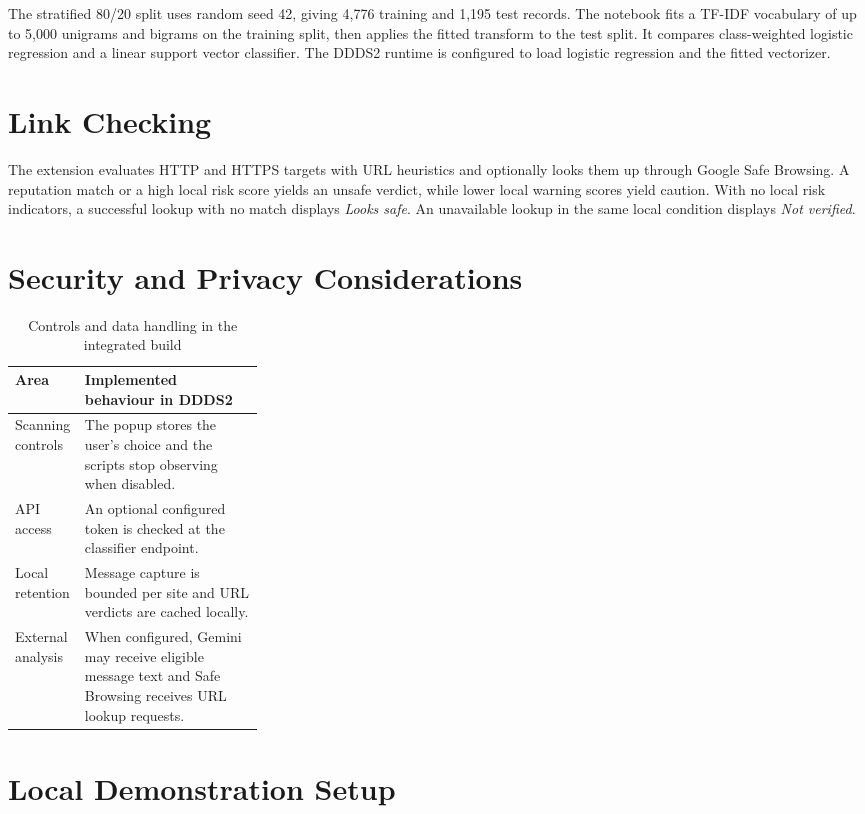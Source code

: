 \documentclass[12pt,letterpaper,twoside,openany]{book}
\begin{document}
The stratified 80/20 split uses random seed 42, giving 4,776 training and 1,195 test records. The notebook fits a TF-IDF vocabulary of up to 5,000 unigrams and bigrams on the training split, then applies the fitted transform to the test split. It compares class-weighted logistic regression and a linear support vector classifier. The DDDS2 runtime is configured to load logistic regression and the fitted vectorizer. \cite{notebook,integration}

\section{Link Checking}

The extension evaluates HTTP and HTTPS targets with URL heuristics and optionally looks them up through Google Safe Browsing. A reputation match or a high local risk score yields an unsafe verdict, while lower local warning scores yield caution. With no local risk indicators, a successful lookup with no match displays \textit{Looks safe}. An unavailable lookup in the same local condition displays \textit{Not verified}. \cite{integration}

\section{Security and Privacy Considerations}

\begin{table}[!htbp]
\centering
\small
\begin{tabularx}{\linewidth}{@{}p{0.29\linewidth}Y@{}}
\toprule
\textbf{Area} & \textbf{Implemented behaviour in DDDS2} \\
\midrule
Scanning controls & The popup stores the user's choice and the scripts stop observing when disabled. \\
API access & An optional configured token is checked at the classifier endpoint. \\
Local retention & Message capture is bounded per site and URL verdicts are cached locally. \\
External analysis & When configured, Gemini may receive eligible message text and Safe Browsing receives URL lookup requests. \\
\bottomrule
\end{tabularx}
\caption{Controls and data handling in the integrated build}
\label{tab:controls}
\end{table}

\section{Local Demonstration Setup}
\end{document}
